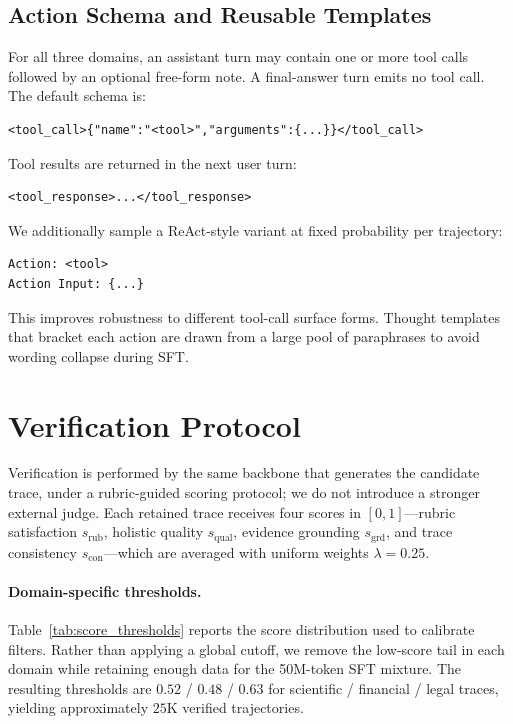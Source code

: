 \subsection{Action Schema and Reusable Templates}
\label{app:schema}

For all three domains, an assistant turn may contain one or more tool
calls followed by an optional free-form note. A final-answer turn emits
no tool call. The default schema is:
\begin{lstlisting}[basicstyle=\ttfamily\scriptsize,breaklines=true]
<tool_call>{"name":"<tool>","arguments":{...}}</tool_call>
\end{lstlisting}
Tool results are returned in the next user turn:
\begin{lstlisting}[basicstyle=\ttfamily\scriptsize,breaklines=true]
<tool_response>...</tool_response>
\end{lstlisting}
We additionally sample a ReAct-style variant at fixed probability per
trajectory:
\begin{lstlisting}[basicstyle=\ttfamily\scriptsize,breaklines=true]
Action: <tool>
Action Input: {...}
\end{lstlisting}
This improves robustness to different tool-call surface forms. Thought
templates that bracket each action are drawn from a large pool of
paraphrases to avoid wording collapse during SFT.

\section{Verification Protocol}
\label{app:verification}

Verification is performed by the same backbone that generates the
candidate trace, under a rubric-guided scoring protocol; we do not
introduce a stronger external judge. Each retained trace receives four
scores in $[0,1]$---rubric satisfaction $s_{\mathrm{rub}}$, holistic
quality $s_{\mathrm{qual}}$, evidence grounding $s_{\mathrm{grd}}$, and
trace consistency $s_{\mathrm{con}}$---which are averaged with uniform
weights $\lambda=0.25$.

\paragraph{Domain-specific thresholds.}
Table~\ref{tab:score_thresholds} reports the score distribution used to
calibrate filters. Rather than applying a global cutoff, we remove the
low-score tail in each domain while retaining enough data for the
50M-token SFT mixture. The resulting thresholds are $0.52$ / $0.48$ /
$0.63$ for scientific / financial / legal traces, yielding approximately
$25$K verified trajectories.

